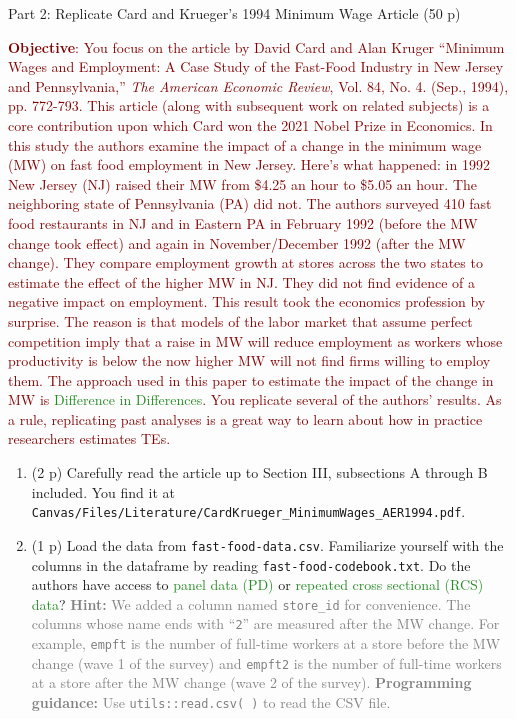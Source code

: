 \documentclass[
]{article}
\begin{document}
\newpage

\begin{center}
{\LARGE Part 2: Replicate Card and Krueger's 1994 Minimum Wage Article (50 p)}
\end{center}

\noindent \textcolor{Maroon}{\textbf{Objective}: You focus on the article by David Card and Alan Kruger ``Minimum Wages and Employment: A Case Study of the Fast-Food Industry in New Jersey and Pennsylvania,'' \textit{The American Economic Review}, Vol. 84, No. 4. (Sep., 1994), pp. 772-793. This article (along with subsequent work on related subjects) is a core contribution upon which Card won the 2021 Nobel Prize in Economics. In this study the authors examine the impact of a change in the minimum wage (MW) on fast food employment in New Jersey. Here's what happened: in 1992 New Jersey (NJ) raised their MW from \$4.25 an hour to \$5.05 an hour. The neighboring state of Pennsylvania (PA) did not. The authors surveyed 410 fast food restaurants in NJ and in Eastern PA in February 1992 (before the MW change took effect) and again in November/December 1992 (after the MW change). They compare employment growth at stores across the two states to estimate the effect of the higher MW in NJ. They did not find evidence of a negative impact on employment. This result took the economics profession by surprise. The reason is that models of the labor market that assume perfect competition imply that a raise in MW will reduce employment as workers whose productivity is below the now higher MW will not find firms willing to employ them. The approach used in this paper to estimate the impact of the change in MW is \textcolor{ForestGreen}{Difference in Differences}. You replicate several of the authors' results. As a rule, replicating past analyses is a great way to learn about how in practice researchers estimates TEs.}

\begin{enumerate}
\def\labelenumi{\arabic{enumi}.}
\setcounter{enumi}{8}
\item
  (2 p) Carefully read the article up to Section III, subsections A
  through B included. You find it at
  \newline \texttt{Canvas/Files/Literature/CardKrueger\_MinimumWages\_AER1994.pdf}.
\item
  (1 p) Load the data from \texttt{fast-food-data.csv}. Familiarize
  yourself with the columns in the dataframe by reading
  \texttt{fast-food-codebook.txt}. Do the authors have access to
  \textcolor{ForestGreen}{panel data (PD)} or
  \textcolor{ForestGreen}{repeated cross sectional (RCS) data}?
  \textcolor{gray}{\textbf{Hint:} We added a column named \texttt{store\_id} for convenience. The columns whose name ends with ``\texttt{2}'' are measured after the MW change. For example, \texttt{empft} is the number of full-time workers at a store before the MW change (wave 1 of the survey) and \texttt{empft2} is the number of full-time workers at a store after the MW change (wave 2 of the survey).}
  \textcolor{gray}{\textbf{Programming guidance:} Use \texttt{utils::read.csv( )} to read the CSV file.}
\end{enumerate}
\end{document}
